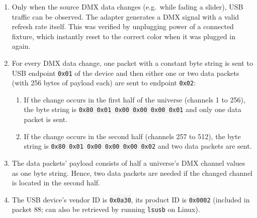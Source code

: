 \begin{enumerate}
\def\labelenumi{\arabic{enumi}.}
\tightlist
\item
  Only when the source DMX data changes (e.g.~while fading a slider),
  USB traffic can be observed. The adapter generates a DMX signal with a
  valid refresh rate itself. This was verified by unplugging power of a
  connected fixture, which instantly reset to the correct color when it
  was plugged in again.
\item
  For every DMX data change, one packet with a constant byte string is
  sent to USB endpoint \colorbox{WhiteSmoke}{\lstinline!0x01!} of the device and then either
  one or two data packets (with 256 bytes of payload each) are sent to
  endpoint \colorbox{WhiteSmoke}{\lstinline!0x02!}:

  \begin{enumerate}
  \def\labelenumii{\alph{enumii})}
  \tightlist
  \item
    If the change occurs in the first half of the universe (channels 1
    to 256), the byte string is
    \colorbox{WhiteSmoke}{\lstinline!0x80 0x01 0x00 0x00 0x00 0x01!} and only one data packet
    is sent.
  \item
    If the change occurs in the second half (channels 257 to 512), the
    byte string is \colorbox{WhiteSmoke}{\lstinline!0x80 0x01 0x00 0x00 0x00 0x02!} and two
    data packets are sent.
  \end{enumerate}
\item
  The data packets' payload consists of half a universe's DMX channel
  values as one byte string. Hence, two data packets are needed if the
  changed channel is located in the second half.
\item
  The USB device's vendor ID is \colorbox{WhiteSmoke}{\lstinline!0x0a30!}, its product ID is
  \colorbox{WhiteSmoke}{\lstinline!0x0002!} (included in packet 88; can also be retrieved by
  running \colorbox{WhiteSmoke}{\lstinline!lsusb!} on Linux).
\end{enumerate}

